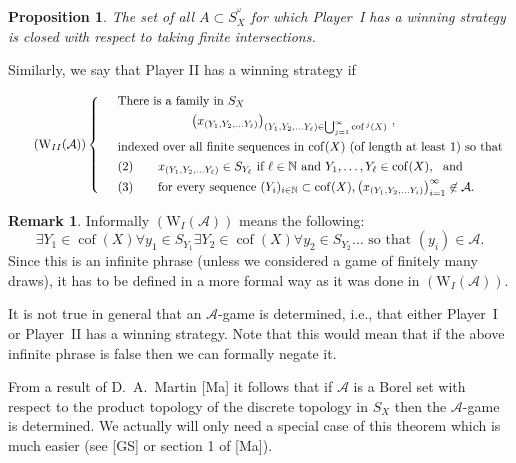 \documentclass[11pt,leqno]{amsart}
\newtheorem{prop}[thm]{Proposition}
\theoremstyle{definition}
\newtheorem*{remark}{Remark}
\newcommand{\n}{\noindent}
\newcommand{\cof}{\operatorname{cof}}
\newcommand{\cA}{\mathcal{A}}
\newcommand{\N}{\mathbb{N}}
\begin{document}
\begin{prop}\label{P0}
The set of all $A\subset S^{^\omega}_X$ for which Player~I has 
a winning strategy is closed with respect to taking finite intersections.
\end{prop}

\n Similarly, we say that Player II has a winning strategy if
 
\begin{equation}\tag*{$(\text{W}_{II}(\cA))$}
\left\{ \begin{array}{cl}
&\text{There is a family in $S_X$}\\
\noalign{\vskip4pt}
&\qquad\qquad\qquad
\bigl(x_{(Y_1,Y_2,\ldots Y_\ell)}\bigr)_{(Y_1,Y_2,\ldots Y_\ell)
\in\bigcup_{j=1}^\infty \cof^{\,j}(X)}\ ,\\
\noalign{\vskip4pt}
&\text{indexed over all finite sequences in $\cof(X)$ 
(of length at least 1) so that}\\
\noalign{\vskip4pt}
&(2)\qquad  x_{(Y_1,Y_2,\ldots Y_\ell)}\in S_{Y_\ell}
\text{ if }\ell\in\N\text{ and }Y_1,\ldots ,Y_\ell\in\cof(X),\ \text{ and}\\
\noalign{\vskip4pt}
&(3)\qquad \text{for every sequence }(Y_i)_{i\in\N}\subset\cof(X), 
\bigl(x_{(Y_1,Y_2,\ldots Y_i)}\bigr)_{i=1}^\infty\not\in\cA.    
\end{array} \right.
\end{equation}
\addtocounter{equation}{2}

\begin{remark} 
Informally $(\text{W}_{I}(\cA))$ means the following:
$$\exists Y_1\in\cof(X)\forall y_1\in S_{Y_1}\exists Y_2\in\cof(X)
\forall y_2\in S_{Y_2}\ldots\text{ so that }
(y_i)\in\cA.$$
Since this is an infinite phrase (unless we considered a game 
of finitely many draws), it has to be defined
in a more formal way as it was done in  $(\text{W}_{I}(\cA))$. 
 
It is not true in general that an $\cA$-game is determined, i.e.,
that either Player~I or Player~II has a winning strategy. 
Note that this would mean that if the  above infinite phrase is false then 
we can formally negate it. 
  
{From} a result of D.~A.~Martin [Ma] it follows that if $\cA$ is a 
Borel set with respect to the product topology
of the discrete topology in $S_X$ then the $\cA$-game is determined. 
We actually will only need a special case of this theorem which is much 
easier (see [GS] or section 1 of [Ma]). 
\end{remark}
  
\end{document}
